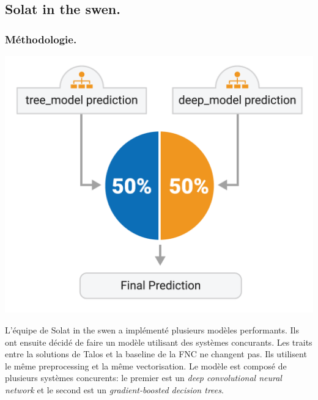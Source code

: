 \documentclass[onecolumn, 12pt]{article}
\begin{document}
\subsection{Solat in the swen.}
\subsubsection{Méthodologie.}
\begin{center}
 \includegraphics[scale=0.5]{../../img/model/solat_in_the_swen/final_prediction_light.png}
 \label{fig0}
\end{center}

L'équipe de Solat in the swen a implémenté plusieurs modèles performants.
Ils ont ensuite décidé de faire un modèle utilisant des systèmes concurants.
Les traits entre la solutions de Talos et la baseline de la FNC ne changent pas.
Ils utilisent le même preprocessing et la même vectorisation.
Le modèle est composé de plusieurs systèmes concurents: le premier est un \textit{deep convolutional neural network} et le second est un \textit{gradient-boosted decision trees}.
\end{document}
